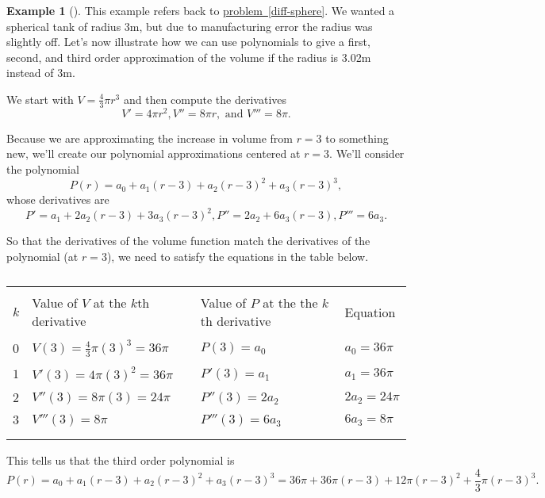 \documentclass[10pt,]{book}
\theoremstyle{plain}
\theoremstyle{definition}
\theoremstyle{definition}
\theoremstyle{definition}
\newtheorem{example}[theorem]{Example}
\theoremstyle{definition}
\theoremstyle{definition}
\numberwithin{equation}{section}
\newcommand{\hrulethin}  {\noalign{\hrule height 0.04em}}
\begin{document}
\begin{example}[]\label{example-1}
This example refers back to \hyperref[diff-sphere]{problem~\ref{diff-sphere}}. We wanted a spherical tank of radius 3m, but due to manufacturing error the radius was slightly off. Let's now illustrate how we can use polynomials to give a first, second, and third order approximation of the volume if the radius is 3.02m instead of 3m.%
\par
We start with \(V=\frac{4}{3} \pi r^3\) and then compute the derivatives%
\begin{equation*}
V'=4\pi r^2, V''=8\pi r, \text{ and }  V'''=8\pi.
\end{equation*}
%
\par
Because we are approximating the increase in volume from \(r=3\) to something new, we'll create our polynomial approximations centered at \(r=3\). We'll consider the polynomial%
\begin{equation*}
P(r)=a_0+a_1(r-3)+a_2(r-3)^2+a_3(r-3)^3,
\end{equation*}
whose derivatives are%
\begin{equation*}
P'=a_1+2a_2(r-3)+3a_3(r-3)^2,
P''=2a_2+6a_3(r-3),
P'''=6a_3.
\end{equation*}
%
\par
So that the derivatives of the volume function match the derivatives of the polynomial (at \(r=3\)), we need to satisfy the equations in the table below.%
\begin{table}
\centering
\begin{tabular}{llll}
&&&\tabularnewline\hrulethin
\(k\)&Value of \(V\) at the \(k\)th derivative&Value of \(P\) at the the \(k\)th derivative&Equation\tabularnewline[0pt]
&&&\tabularnewline\hrulethin
\(0\)&\(V(3) = \frac{4}{3}\pi (3)^3 = 36\pi\)&\(P(3) = a_0\)&\(a_0=36\pi\)\tabularnewline[0pt]
&&&\tabularnewline\hrulethin
\(1\)&\(V'(3) = 4\pi (3)^2=36\pi\)&\(P'(3) = a_1\)&\(a_1=36\pi\)\tabularnewline[0pt]
&&&\tabularnewline\hrulethin
\(2\)&\(V''(3) = 8\pi (3)=24\pi\)&\(P''(3) = 2a_2\)&\(2a_2=24\pi\)\tabularnewline[0pt]
&&&\tabularnewline\hrulethin
\(3\)&\(V'''(3) = 8\pi\)&\(P'''(3) = 6a_3\)&\(6a_3=8\pi\)\tabularnewline[0pt]
&&&\tabularnewline\hrulethin
\end{tabular}
\caption{\label{table-1}}
\end{table}
This tells us that the third order polynomial is%
\begin{equation*}
P(r)=a_0+a_1(r-3)+a_2(r-3)^2+a_3(r-3)^3
=36\pi+36\pi(r-3)+12\pi(r-3)^2+\frac{4}{3}\pi(r-3)^3
.
\end{equation*}

\end{example}
\end{document}
